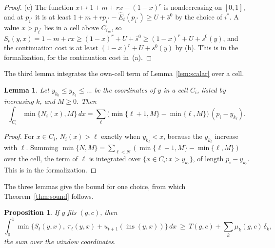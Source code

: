 \documentclass[11pt]{amsart}
\newtheorem{lemma}[theorem]{Lemma}
\newtheorem{proposition}[theorem]{Proposition}
\theoremstyle{definition}
\numberwithin{equation}{section}
\newcommand{\lean}[1]{\ignorespaces}
\newcommand{\ins}{\operatorname{ins}}
\begin{document}
\begin{proof}
(c) The function $x\mapsto1+m+rx-(1-x)^r$ is nondecreasing on $[0,1]$, and at $p_{i^*}$ it is at least $1+m+rp_{i^*}-\hat E_t(p_{i^*})\ge U+\bar s^0$ by the choice of $i^*$. A value $x>p_{i^*}$ lies in a cell above $C_{i_m}$, so $S_t(y,x)=1+m+rx\ge(1-x)^r+U+\bar s^0\ge(1-x)^r+U+s^0(y)$, and the continuation cost is at least $(1-x)^r+U+s^0(y)$ by (b). This is  in the formalization, for the continuation cost in~(a).
\end{proof}

The third lemma integrates the own-cell term of Lemma~\ref{lem:scalar} over a cell.

\begin{lemma}\label{lem:owncell}\lean{Robbins.Cert.SO.integral_min_count}
Let $y_{k_0}\le y_{k_1}\le\dots$ be the coordinates of $y$ in a cell $C_i$, listed by increasing $k$, and $M\ge0$. Then
\[
\int_{C_i}\min\bigl\{N_i(x),M\bigr\}\,dx=\sum_{\ell}\bigl(\min\{\ell+1,M\}-\min\{\ell,M\}\bigr)\,(p_i-y_{k_\ell}).
\]
\end{lemma}

\begin{proof}
For $x\in C_i$, $N_i(x)>\ell$ exactly when $y_{k_\ell}<x$, because the $y_{k_\ell}$ increase with $\ell$. Summing $\min\{N,M\}=\sum_{\ell<N}(\min\{\ell+1,M\}-\min\{\ell,M\})$ over the cell, the term of $\ell$ is integrated over $\{x\in C_i:x>y_{k_\ell}\}$, of length $p_i-y_{k_\ell}$. This is  in the formalization.
\end{proof}

The three lemmas give the bound for one choice, from which Theorem~\ref{thm:sound} follows.

\begin{proposition}\label{prop:onechoice}\lean{Robbins.Cert.SO.bound_le_integral, Robbins.Cert.SO.head_cell, Robbins.Cert.SO.tail_cell, Robbins.Cert.SO.final_seg, Robbins.Cert.SO.cell_int_le}
If $y$ fits $(g,c)$, then
\[
\int_0^1\min\bigl\{S_t(y,x),\ \pi_t(y,x)+u_{t+1}(\ins(y,x))\bigr\}\,dx\ \ge\ T(g,c)+\sum_k\mu_k(g,c)\,\delta_k,
\]
the sum over the window coordinates.
\end{proposition}
\end{document}

